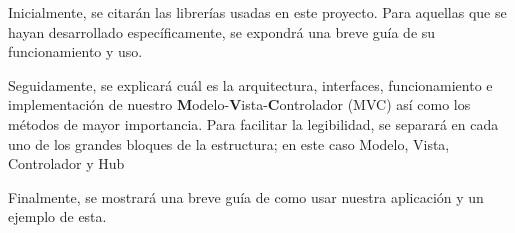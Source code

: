 \documentclass[12pt,journal,compsoc]{IEEEtran}
\begin{document}
Inicialmente, se citarán las librerías usadas en este proyecto. Para aquellas que se hayan desarrollado específicamente, se expondrá una breve guía de su funcionamiento y uso.\bigskip

Seguidamente, se explicará cuál es la arquitectura, interfaces, funcionamiento e implementación de nuestro \textbf{M}odelo-\textbf{V}ista-\textbf{C}ontrolador (MVC) así como los métodos de mayor importancia. Para facilitar la legibilidad, se separará en cada uno de los grandes bloques de la estructura; en este caso Modelo, Vista, Controlador y Hub\bigskip

Finalmente, se mostrará una breve guía de como usar nuestra aplicación y un ejemplo de esta.







\end{document}
